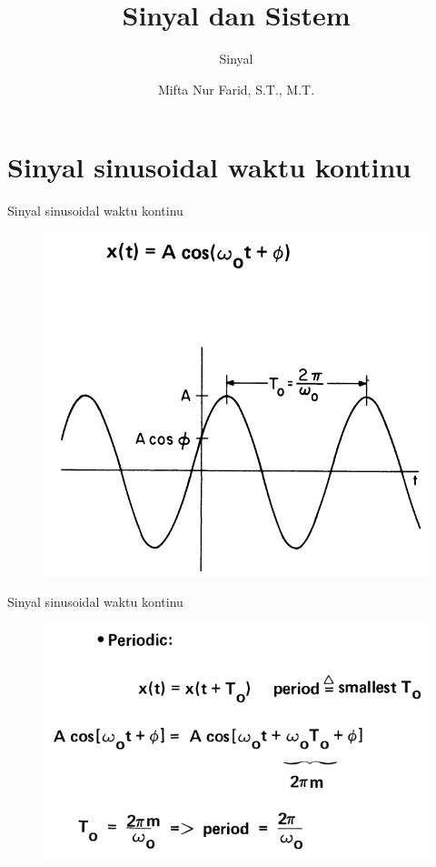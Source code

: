 \documentclass[pdflatex,compress,mathserif]{beamer}
\title{Sinyal dan Sistem}
\subtitle{Sinyal}
\author{Mifta Nur Farid, S.T., M.T.}
\begin{document}
\maketitle

\section{Sinyal sinusoidal waktu kontinu}
\begin{frame}{Sinyal sinusoidal waktu kontinu}
	\begin{figure}
		\centering
		\includegraphics[height=0.8\textheight]{img/01.slide_01}
	\end{figure}
\end{frame}

\begin{frame}{Sinyal sinusoidal waktu kontinu}
	\begin{figure}
		\centering
		\includegraphics[height=0.7\textheight]{img/01.slide_02_01}
	\end{figure}
\end{frame}
\end{document}
